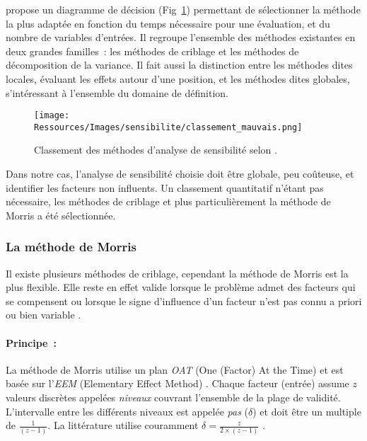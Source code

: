 \textcite{Iooss2011} propose un diagramme de décision (Fig~\ref{fig:classement_methode_sensibilite})
permettant de sélectionner la méthode la plus adaptée en fonction du temps nécessaire pour
une évaluation, et du nombre de variables d’entrées. Il regroupe l’ensemble
des méthodes existantes en deux grandes familles~: les méthodes de criblage et les méthodes
de décomposition de la variance. Il fait aussi la distinction entre les
méthodes dites locales, évaluant les effets autour d’une position, et les méthodes
dites globales, s’intéressant à l’ensemble du domaine de définition.

\begin{figure}
    \begin{center}
        \texttt{[image: Ressources/Images/sensibilite/classement\_mauvais.png]}
    \end{center}
    \caption{Classement des méthodes d’analyse de sensibilité selon \cite{Iooss2011}.
             \label{fig:classement_methode_sensibilite}}
\end{figure}


Dans notre cas, l’analyse de sensibilité choisie doit être globale, peu coûteuse,
et identifier les facteurs non influents. Un classement quantitatif n’étant pas
nécessaire, les méthodes de criblage et plus particulièrement la méthode de Morris
a été sélectionnée.



\subsubsection{La méthode de Morris} %
\label{ssub:la_methode_de_morris}
Il existe plusieurs méthodes de criblage, cependant la méthode de Morris \parencite{Morris1991161}
est la plus flexible. Elle reste en effet valide lorsque le problème admet des facteurs
qui se compensent ou lorsque le signe d’influence d’un facteur n’est pas connu a priori
ou bien variable \parencite{Saltelli2004}.

\paragraph{Principe~:} %
\label{par:principe}
La méthode de Morris utilise un plan \textit{OAT} (One (Factor) At the Time) et est basée
sur l’\textit{EEM} (Elementary Effect Method) \parencite{Saltelli2004}. Chaque facteur
(entrée) assume $z$ valeurs discrètes appelées \emph{niveaux} couvrant l’ensemble de la
plage de validité. L’intervalle entre les différents niveaux est appelée \emph{pas}
($\delta$) et doit être un multiple de $\frac{1}{(z - 1)}$. La littérature utilise
couramment $\delta = \frac{z}{2 \times (z - 1)}$ \parencite{Morris1991161, Campolongo20071509}.

